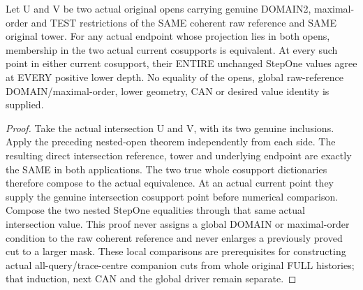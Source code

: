 \begin{theorem}
\label{hir:original-bound-two-stepone-locally-domain-two-opens}
\leanok
Let U and V be two actual original opens carrying genuine DOMAIN2,
maximal-order and TEST restrictions of the SAME coherent raw reference
and SAME original tower. For any actual endpoint whose projection lies
in both opens, membership in the two actual current cosupports is
equivalent. At every such point in either current cosupport, their ENTIRE
unchanged StepOne values agree at EVERY positive lower depth. No equality
of the opens, global raw-reference DOMAIN/maximal-order, lower geometry,
CAN or desired value identity is supplied.
\end{theorem}
\begin{proof}
Take the actual intersection U and V, with its two genuine inclusions.
Apply the preceding nested-open theorem independently from each side.
The resulting direct intersection reference, tower and underlying
endpoint are exactly the SAME in both applications. The two true whole
cosupport dictionaries therefore compose to the actual equivalence.
At an actual current point they supply the genuine intersection cosupport
point before numerical comparison. Compose the two nested StepOne
equalities through that same actual intersection value. This proof never
assigns a global DOMAIN or maximal-order condition to the raw coherent
reference and never enlarges a previously proved cut to a larger mask.
These local comparisons are prerequisites for constructing actual
all-query/trace-centre companion cuts from whole original FULL histories;
that induction, next CAN and the global driver remain separate.
\end{proof}
